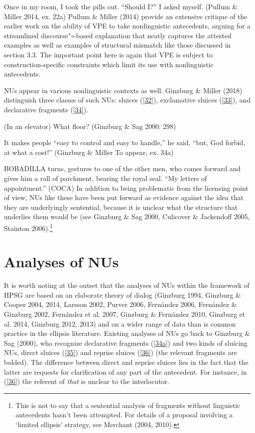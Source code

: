 \documentclass[output=paper
                ,modfonts
                ,nonflat
	        ,collection
	        ,collectionchapter
	        ,collectiontoclongg
 	        ,biblatex
                ,babelshorthands
                ,newtxmath
                ,draftmode
                ,colorlinks, citecolor=brown
]{./langsci/langscibook}
\begin{document}
{\ea Once in my room, I took the pills out. ``Should I?'' I asked myself. (Pullum \& Miller 2014, ex. 22a)\label{31}\z
Pullum \& Miller (2014) provide an extensive critique of the earlier work on the ability of VPE to take nonlinguistic antecedents, arguing for a streamlined discourse"=based explanation that neatly captures the attested examples as well as examples of structural mismatch like those discussed in section 3.3. The important point here is again that VPE is subject to construction-specific constraints which limit its use with nonlinguistic antecedents.

NUs appear in various nonlinguistic contexts as well. Ginzburg \& Miller (2018) distinguish three classes of such NUs: sluices (\ref{32}), exclamative sluices (\ref{33}), and declarative fragments (\ref{34}).

\ea (In an elevator) What floor? (Ginzburg \& Sag 2000: 298)\label{32}\z

\ea It makes people ``easy to control and easy to handle,'' he said, ``but, God forbid, at what a cost!'' (Ginzburg \& Miller To appear, ex. 34a)\label{33}\z

\ea BOBADILLA turns, gestures to one of the other men, who comes forward and gives him a roll of parchment, bearing the royal seal. ``My letters of appointment.'' (COCA)\label{34}\z
In addition to being problematic from the licensing point of view, NUs like these have been put forward as evidence against the idea that they are underlyingly sentential, because it is unclear what the structure that underlies them would be (see Ginzburg \& Sag 2000, Culicover \& Jackendoff 2005, Stainton 2006).\footnote{This is not to say that a sentential analysis of fragments without linguistic antecedents hasn't been attempted. For details of a proposal involving a `limited ellipsis' strategy, see Merchant (2004, 2010).}


\section{Analyses of NUs}
It is worth noting at the outset that the analyses of NUs within the framework of HPSG are based on an elaborate theory of dialog (Ginzburg 1994, Ginzburg \& Cooper 2004, 2014, Larsson 2002, Purver 2006, Fern\'{a}ndez 2006, Fern\'{a}ndez \& Ginzburg 2002, Fern\'{a}ndez et al. 2007, Ginzburg \& Fern\'{a}ndez 2010, Ginzburg et al. 2014, Ginzburg 2012, 2013) and on a wider range of data than is common practice in the ellipsis literature. Existing analyses of NUs go back to Ginzburg \& Sag (2000), who recognize declarative fragments (\ref{34a}) and two kinds of sluicing NUs, direct sluices (\ref{35}) and reprise sluices (\ref{36}) (the relevant fragments are bolded). The difference between direct and reprise sluices lies in the fact that the latter are requests for clarification of any part of the antecedent. For instance, in (\ref{36}) the referent of {\it that} is unclear to the interlocutor.

}
\end{document}
